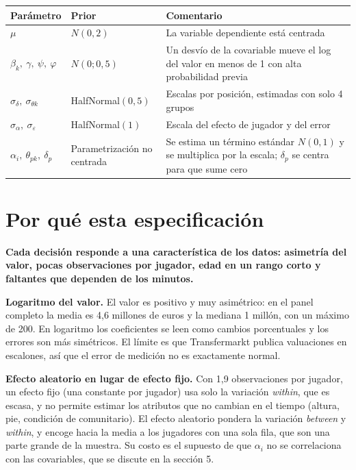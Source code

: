 \documentclass[11pt,a4paper]{article}
\newcommand{\lead}[1]{\textbf{#1}}
\begin{document}
\begin{center}
\small
\begin{tabular}{@{}>{\raggedright\arraybackslash}p{2.5cm}>{\raggedright\arraybackslash}p{3.6cm}>{\raggedright\arraybackslash}p{8.4cm}@{}}
\toprule
Parámetro & Prior & Comentario \\
\midrule
$\mu$ & $N(0,2)$ & La variable dependiente está centrada \\
$\beta_k,\ \gamma,\ \psi,\ \varphi$ & $N(0;0{,}5)$ & Un desvío de la covariable mueve el log del valor en menos de 1 con alta probabilidad previa \\
$\sigma_\delta,\ \sigma_{\theta k}$ & HalfNormal$(0{,}5)$ & Escalas por posición, estimadas con solo 4 grupos \\
$\sigma_\alpha,\ \sigma_\varepsilon$ & HalfNormal$(1)$ & Escala del efecto de jugador y del error \\
$\alpha_i,\ \theta_{pk},\ \delta_p$ & Parametrización no centrada & Se estima un término estándar $N(0,1)$ y se multiplica por la escala; $\delta_p$ se centra para que sume cero \\
\bottomrule
\end{tabular}
\end{center}

\section{Por qué esta especificación}

\lead{Cada decisión responde a una característica de los datos: asimetría del valor, pocas observaciones por jugador, edad en un rango corto y faltantes que dependen de los minutos.}

\lead{Logaritmo del valor.} El valor es positivo y muy asimétrico: en el panel completo la media es 4,6 millones de euros y la mediana 1 millón, con un máximo de 200. En logaritmo los coeficientes se leen como cambios porcentuales y los errores son más simétricos. El límite es que Transfermarkt publica valuaciones en escalones, así que el error de medición no es exactamente normal.

\lead{Efecto aleatorio en lugar de efecto fijo.} Con 1,9 observaciones por jugador, un efecto fijo (una constante por jugador) usa solo la variación \emph{within}, que es escasa, y no permite estimar los atributos que no cambian en el tiempo (altura, pie, condición de comunitario). El efecto aleatorio pondera la variación \emph{between} y \emph{within}, y encoge hacia la media a los jugadores con una sola fila, que son una parte grande de la muestra. Su costo es el supuesto de que $\alpha_i$ no se correlaciona con las covariables, que se discute en la sección 5.
\end{document}
